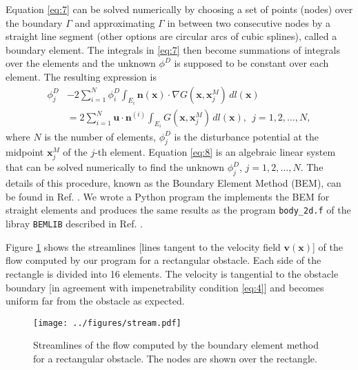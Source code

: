 \documentclass[11pt]{article}
\begin{document}
Equation \eqref{eq:7} can be solved numerically by choosing a set of points (nodes) over the boundary $\Gamma$ and approximating $\Gamma$ in between two consecutive nodes by a straight line segment (other options are circular arcs of cubic splines), called a boundary element. The integrals in \eqref{eq:7} then become summations of integrals over the elements and the unknown $\phi^D$ is supposed to be constant over each element. The resulting expression is
\begin{align}
\phi^{D}_{j} 
&- 2 \sum_{i=1}^{N} \phi^{D}_{i} 
   \int_{E_i} \mathbf{n}(\mathbf{x}) \cdot \nabla G(\mathbf{x}, \mathbf{x}^{M}_{j}) \, dl(\mathbf{x}) \nonumber \\
&= 2 \sum_{i=1}^{N} 
   \mathbf{u} \cdot \mathbf{n}^{(i)} 
   \int_{E_i} G(\mathbf{x}, \mathbf{x}^{M}_{j}) \, dl(\mathbf{x}) ,~~j=1,2,\ldots,N,\label{eq:8}
\end{align}
where $N$ is the number of elements, $\phi^D_j$ is the disturbance potential at the midpoint $\mathbf{x}^M_j$ of the $j$-th element. Equation \eqref{eq:8} is an algebraic linear system that can be solved numerically to find the unknown $\phi^D_j$, $j=1,2,\ldots,N$. The details of this procedure, known as the Boundary Element Method (BEM), can be found in Ref. \cite{pozrikidis2002practical}. We wrote a Python program the implements the BEM for straight elements and produces the same results as the program {\tt body\_2d.f} of the libray {\tt BEMLIB} described in Ref. \cite{pozrikidis2002practical}.

Figure \ref{fig:stream} shows the streamlines [lines tangent to the velocity field $\mathbf{v}(\mathbf{x})$] of the flow computed by our program for a rectangular obstacle. Each side of the rectangle is divided into 16 elements. The velocity is tangential to the obstacle boundary [in agreement with impenetrability condition \ref{eq:4}] and becomes uniform far from the obstacle as expected.

\begin{figure}[h]
  \centering
      \texttt{[image: ../figures/stream.pdf]}
  \caption{Streamlines of the flow computed by the boundary element method for a rectangular obstacle. The nodes are shown over the rectangle.}
  \label{fig:stream}
\end{figure}
\end{document}
